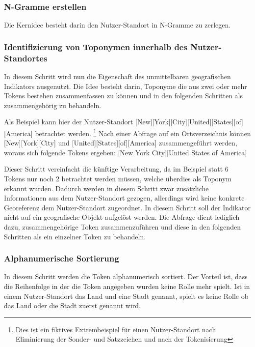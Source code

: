 			\subsubsection{N-Gramme erstellen}

				Die Kernidee besteht darin den Nutzer-Standort in N-Gramme zu zerlegen. 


		  	\subsubsection{Identifizierung von Toponymen innerhalb des Nutzer-Standortes}
		  		
		  		In diesem Schritt wird nun die Eigenschaft des unmittelbaren geografischen Indikators ausgenutzt.
		  		Die Idee besteht darin, Toponyme die aus zwei oder mehr Tokens bestehen zusammenfassen zu können und in den folgenden Schritten als zusammengehörig zu behandeln.

		  		Als Beispiel kann hier der Nutzer-Standort [New][York][City][United][States][of][America] betrachtet werden. \footnote{Dies ist ein fiktives Extrembeispiel für einen Nutzer-Standort nach Eliminierung der Sonder- und Satzzeichen und nach der Tokenisierung}
		  		Nach einer Abfrage auf ein Ortsverzeichnis können [New][York][City] und [United][States][of][America] zusammengeführt werden, woraus sich folgende Tokens ergeben:
		  		[New York City][United States of America]   

		  		Dieser Schritt vereinfacht die künftige Verarbeitung, da im Beispiel statt 6 Tokens nur noch 2 betrachtet werden müssen, welche überdies als Toponym erkannt wurden.
		  		Dadurch werden in diesem Schritt zwar zusätzliche Informationen aus dem Nutzer-Standort gezogen, allerdings wird keine konkrete Georeferenz dem Nutzer-Standort zugeordnet.
		  		In diesem Schritt soll der Indikator nicht auf ein geografische Objekt aufgelöst werden. 
		  		Die Abfrage dient lediglich dazu, zusammengehörige Token zusammenzuführen und diese in den folgenden Schritten als ein einzelner Token zu behandeln. 




		  	\subsubsection{Alphanumerische Sortierung}

		  		In diesem Schritt werden die Token alphanumerisch sortiert. 
		  		Der Vorteil ist, dass die Reihenfolge in der die Token angegeben wurden keine Rolle mehr spielt. 
		  		Ist in einem Nutzer-Standort das Land und eine Stadt genannt, spielt es keine Rolle ob das Land oder die Stadt zuerst genannt wird. 

